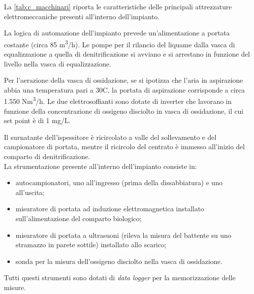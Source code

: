 La \autoref{tab:c_macchinari} riporta le caratteristiche delle principali attrezzature elettromeccaniche presenti all'interno dell'impianto.

La logica di automazione dell'impianto prevede un'alimentazione a portata costante (circa 85 m\textsuperscript{3}/h). Le pompe per il rilancio del liquame dalla vasca di equalizzazione a quella di denitrificazione si avviano e si arrestano in funzione del livello nella vasca di equalizzazione.

Per l'aerazione della vasca di ossidazione, se si ipotizza che l'aria in aspirazione abbia una temperatura pari a 30\textdegree C, la portata di aspirazione corrisponde a circa 1.550 Nm\textsuperscript{3}/h. Le due elettrosoffianti sono dotate di inverter che lavorano in funzione della concentrazione di ossigeno disciolto in vasca di ossidazione, il cui set point è di 1 mg/L.

Il surnatante dell'ispessitore è ricircolato a valle del sollevamento e del campionatore di portata, mentre il ricircolo del centrato è immesso all'inizio del comparto di denitrificazione.\\

La strumentazione presente all'interno dell'impianto consiste in:
\begin{itemize}
	\item autocampionatori, uno all'ingresso (prima della dissabbiatura) e uno all'uscita;
	\item misuratore di portata ad induzione elettromagnetica installato sull'alimentazione del comparto biologico;
	\item misuratore di portata a ultrasuoni (rileva la misura del battente su uno stramazzo in parete sottile) installato allo scarico;
	\item sonda per la misura dell'ossigeno disciolto nella vasca di ossidazione.
\end{itemize}

Tutti questi strumenti sono dotati di \textit{data logger} per la memorizzazione delle misure.	\\

